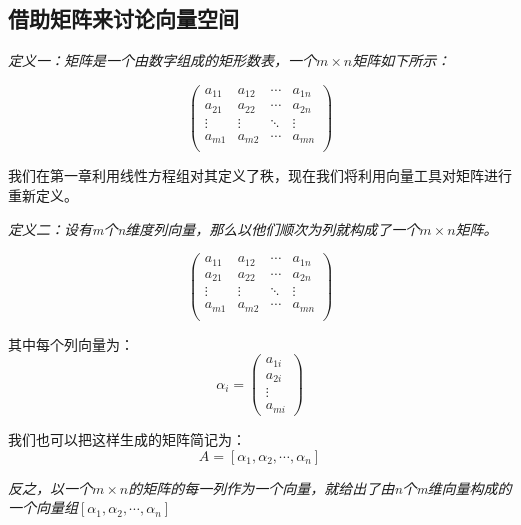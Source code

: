 \documentclass[a4paper]{ctexart}
\begin{document}
\subsection{借助矩阵来讨论向量空间}
\textit{定义一：矩阵是一个由数字组成的矩形数表，一个$m\times n$矩阵如下所示：}

$$
\begin{pmatrix}
a_{11}&a_{12}&\cdots&a_{1n}\\
a_{21}&a_{22}&\cdots&a_{2n}\\
\vdots&\vdots&\ddots&\vdots\\
a_{m1}&a_{m2}&\cdots&a_{mn}\\
\end{pmatrix}
$$

我们在第一章利用线性方程组对其定义了秩，现在我们将利用向量工具对矩阵进行重新定义。

\textit{定义二：设有m个n维度列向量，那么以他们顺次为列就构成了一个$m\times n$矩阵。}

$$
\left(
\begin{array}{c|c|c|c}
a_{11}&a_{12}&\cdots&a_{1n}\\
a_{21}&a_{22}&\cdots&a_{2n}\\
\vdots&\vdots&\ddots&\vdots\\
a_{m1}&a_{m2}&\cdots&a_{mn}\\
\end{array}
\right)
$$

其中每个列向量为：
$$
\alpha_{i}
=
\left(
\begin{array}{c}
  a_{1i}\\
  a_{2i}\\
  \vdots\\
  a_{mi}
\end{array}
\right)
$$

我们也可以把这样生成的矩阵简记为：
$$
A=[\alpha_{1},\alpha_{2},\cdots,\alpha_{n}]
$$

\textit{反之，以一个$m\times n$的矩阵的每一列作为一个向量，就给出了由n个m维向量构成的一个向量组$[\alpha_{1},\alpha_{2},\cdots,\alpha_{n}]$}
\end{document}
